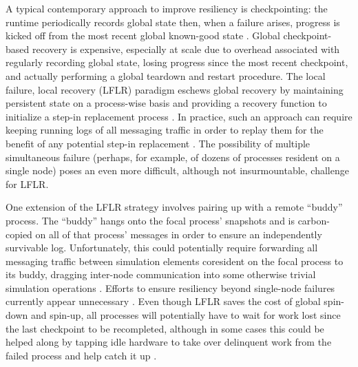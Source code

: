 A typical contemporary approach to improve resiliency is checkpointing: the runtime periodically records global state then, when a failure arises, progress is kicked off from the most recent global known-good state \citep{hursey2007design}.
Global checkpoint-based recovery is expensive, especially at scale due to overhead associated with regularly recording global state, losing progress since the most recent checkpoint, and actually performing a global teardown and restart procedure.
The local failure, local recovery (LFLR) paradigm eschews global recovery by maintaining persistent state on a process-wise basis and providing a recovery function to initialize a step-in replacement process \citep{heroux2014toward,teranishi2014toward}.
In practice, such an approach can require keeping running logs of all messaging traffic in order to replay them for the benefit of any potential step-in replacement \citep{chakravorty2004fault}.
The possibility of multiple simultaneous failure (perhaps, for example, of dozens of processes resident on a single node) poses an even more difficult, although not insurmountable, challenge for LFLR.

One extension of the LFLR strategy involves pairing up with a remote ``buddy'' process.
The ``buddy'' hangs onto the focal process' snapshots and is carbon-copied on all of that process' messages in order to ensure an independently survivable log.
Unfortunately, this could potentially require forwarding all messaging traffic between simulation elements coresident on the focal process to its buddy, dragging inter-node communication into some otherwise trivial simulation operations \citep{chakravorty2007fault}.
Efforts to ensure resiliency beyond single-node failures currently appear unnecessary \citep[p. 12]{ni2016mitigation}.
Even though LFLR saves the cost of global spin-down and spin-up, all processes will potentially have to wait for work lost since the last checkpoint to be recompleted, although in some cases this could be helped along by tapping idle hardware to take over delinquent work from the failed process and help catch it up \citep{dongarra2014applied}.

